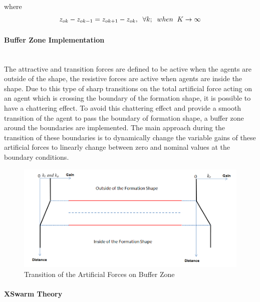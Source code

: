 \documentclass[twoside]{article}
\begin{document}
			where
			\begin{equation}
		z_{ok}- z_{ok -1} = z_{ok+1} - z_{ok}, \hspace{0.2cm}  \forall k ;  \hspace{0.2cm} when  \hspace{0.2cm} K \to\infty
			\end{equation}
			
			
			\paragraph{Buffer Zone Implementation}\hspace{0pt} \\
			
     The attractive and transition forces are defined to be active when the agents are outside of the shape, the resistive forces are active when agents are inside the shape. Due to this type of sharp transitions on the total artificial force acting on an agent which is crossing the boundary of the formation shape, it is possible to have a chattering effect. To avoid this chattering effect and provide a smooth transition of the agent to pass the boundary of formation shape, a buffer zone around the boundaries are implemented. The main approach during the transition of these boundaries is to dynamically change the variable gains of these artificial forces to linearly change between zero and nominal values at the boundary conditions. 
     
			\begin{figure}[H]
				\caption{Transition of the Artificial Forces on Buffer Zone}
				\centering
				\includegraphics[scale = 0.50]{buffer_zone}
			\end{figure}
			
			
			\paragraph{XSwarm Theory}\hspace{0pt} \\
\end{document}
